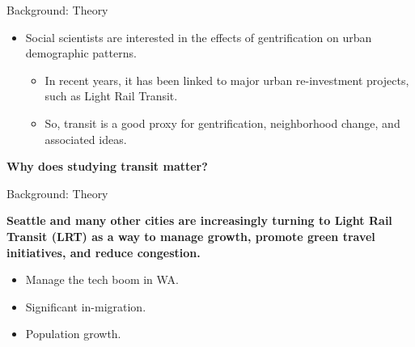 \documentclass[11pt,ignorenonframetext,]{beamer}
\providecommand{\tightlist}{%
  \setlength{\itemsep}{0pt}\setlength{\parskip}{0pt}}
\begin{document}
\begin{frame}{Background: Theory}
\protect\hypertarget{background-theory}{}

\begin{itemize}
\tightlist
\item
  Social scientists are interested in the effects of gentrification on
  urban demographic patterns.

  \begin{itemize}
  \tightlist
  \item
    In recent years, it has been linked to major urban re-investment
    projects, such as Light Rail Transit.
  \item
    So, transit is a good proxy for gentrification, neighborhood change,
    and associated ideas.
  \end{itemize}
\end{itemize}

\textbf{Why does studying transit matter?}

\end{frame}

\begin{frame}{Background: Theory}
\protect\hypertarget{background-theory-1}{}

\textbf{Seattle and many other cities are increasingly turning to Light
Rail Transit (LRT) as a way to manage growth, promote green travel
initiatives, and reduce congestion.}

\begin{itemize}
\tightlist
\item
  Manage the tech boom in WA.
\item
  Significant in-migration.
\item
  Population growth.
\end{itemize}

\end{frame}
\end{document}
